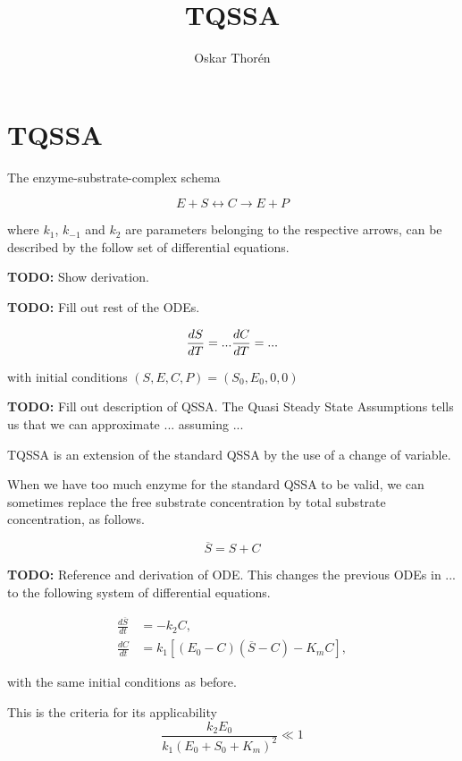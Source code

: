 \documentclass[12pt]{report}
\begin{document}


\title{TQSSA}
\author{Oskar Thor\'{e}n}

\maketitle

\chapter{TQSSA}

The enzyme-substrate-complex schema

\begin{equation}
E + S \leftrightarrow C \rightarrow E + P
\end{equation}

where $k_1$, $k_{-1}$ and $k_2$ are parameters belonging to the respective arrows, can be described by the follow set of differential equations.

\textbf{TODO:} Show derivation.

\textbf{TODO:} Fill out rest of the ODEs.

\begin{equation}
\frac{dS}{dT} = ... \\
\frac{dC}{dT} = ...
\end{equation}

with initial conditions $(S,E,C,P) = (S_0, E_0, 0, 0)$

\textbf{TODO:} Fill out description of QSSA.
The Quasi Steady State Assumptions tells us that we can approximate ... assuming ...

TQSSA is an extension of the standard QSSA by the use of a change of variable.

When we have too much enzyme for the standard QSSA to be valid, we can sometimes replace the free substrate concentration by total substrate concentration, as follows.

\begin{equation}
\overline{S} = S+C
\end{equation}

\textbf{TODO:} Reference and derivation of ODE.
This changes the previous ODEs in ... to the following system of differential equations.

\begin{align*}
\frac{d\overline{S}}{dt} &= -k_2C, \\
\frac{dC}{dt} &= k_1[(E_0 - C)(\overline{S}-C)-K_m C],
\end{align*}

with the same initial conditions as before.



This is the criteria for its applicability
\begin{equation}
\frac{k_2 E_0}{k_1(E_0+S_0+K_m)^2} \ll 1
\end{equation}


\end{document}
